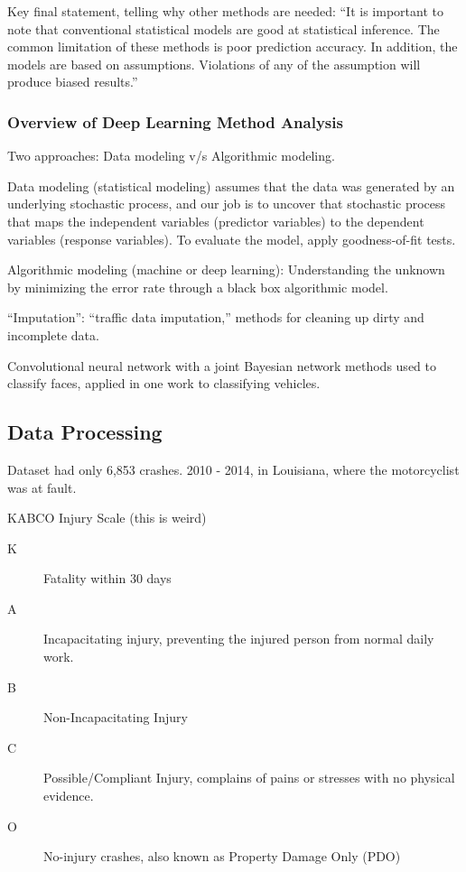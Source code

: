 \documentclass[11pt]{article}
\begin{document}
\begin{spacing}{1.2}
Key final statement, telling why other methods are needed:  ``It is
important to note that conventional statistical models
are good at statistical inference. The common limitation
of these methods is poor prediction accuracy. In addition,
the models are based on assumptions. Violations of
any of the assumption will produce biased results.''

\subsubsection{Overview of Deep Learning Method Analysis}

Two approaches:  Data modeling v/s Algorithmic modeling.  

Data modeling (statistical modeling) assumes that the data was generated by an underlying stochastic process, and our job is to uncover that stochastic process that maps the independent variables (predictor variables) to the dependent variables (response variables).  To evaluate the model, apply goodness-of-fit tests.

Algorithmic modeling (machine or deep learning):  Understanding the unknown by minimizing the error rate through a black box algorithmic model.

``Imputation'':  ``traffic data imputation,'' methods for cleaning up dirty and incomplete data.  

Convolutional neural network with a joint Bayesian network methods used to classify faces, applied in one work to classifying vehicles.  

\subsection{Data Processing}

Dataset had only 6,853 crashes.  2010 - 2014, in Louisiana, where the motorcyclist was at fault.  

KABCO Injury Scale (this is weird)

\begin{description}
	\item [K] Fatality within 30 days
	\item [A] Incapacitating injury, preventing the injured person from normal daily work.
	\item [B] Non-Incapacitating Injury
	\item [C] Possible/Compliant Injury, complains of pains or stresses with no physical evidence.
	\item [O] No-injury crashes, also known as Property Damage Only (PDO)
\end{description}


\end{spacing}
\end{document}
